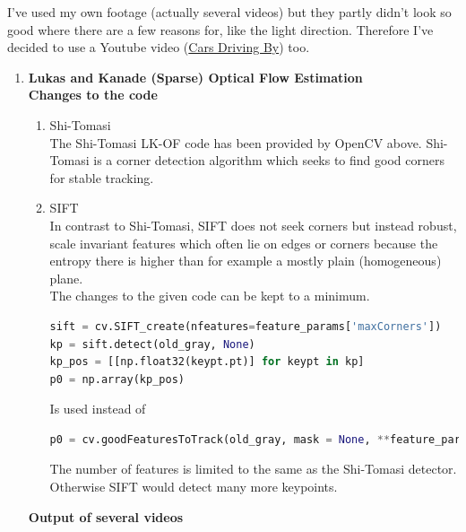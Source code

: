 \documentclass[UTF-8]{article}
\begin{document}
I've used my own footage (actually several videos) but they partly didn't look so good where there are a few reasons for, like the light direction. Therefore I've decided to use a Youtube video (\href{https://youtu.be/e_WBuBqS9h8}{Cars Driving By}) too. 
\begin{enumerate}[{Part} a.]
	\item \textbf{Lukas and Kanade (Sparse) Optical Flow Estimation}\\
	\textbf{Changes to the code}
	\begin{enumerate}[1.]
		\item Shi-Tomasi\\
		The Shi-Tomasi LK-OF code has been provided by OpenCV above. Shi-Tomasi is a corner detection algorithm which seeks to find good corners for stable tracking.
		
		\item SIFT\\
		In contrast to Shi-Tomasi, SIFT does not seek corners but instead robust, scale invariant features which often lie on edges or corners because the entropy there is higher than for example a mostly plain (homogeneous) plane.
		\\
		The changes to the given code can be kept to a minimum.
		\begin{lstlisting}[language=python]
sift = cv.SIFT_create(nfeatures=feature_params['maxCorners'])
kp = sift.detect(old_gray, None)
kp_pos = [[np.float32(keypt.pt)] for keypt in kp]
p0 = np.array(kp_pos)
\end{lstlisting}
	Is used instead of
	\begin{lstlisting}[language=python]
p0 = cv.goodFeaturesToTrack(old_gray, mask = None, **feature_params)
\end{lstlisting}
The number of features is limited to the same as the Shi-Tomasi detector. Otherwise SIFT would detect many more keypoints.
	\end{enumerate}

\textbf{Output of several videos}


\end{enumerate}
\end{document}
